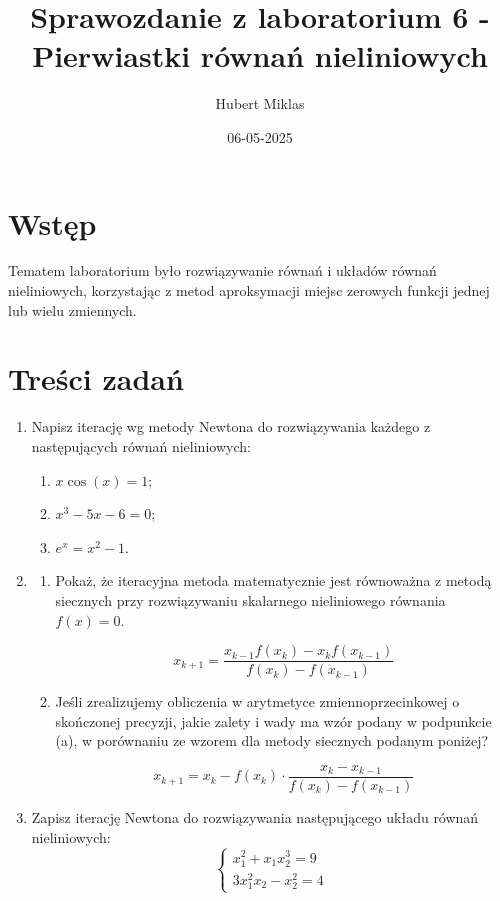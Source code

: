 \documentclass[a4paper,12pt]{article}
\title{Sprawozdanie z laboratorium 6 - Pierwiastki równań nieliniowych}
\author{Hubert Miklas}
\date{06-05-2025}
\begin{document}
    
    \maketitle
    
    \section{Wstęp}
    
    Tematem laboratorium było rozwiązywanie równań i układów równań nieliniowych, korzystając z metod aproksymacji miejsc zerowych funkcji jednej lub wielu zmiennych.
    
    \section{Treści zadań}
    
    \begin{enumerate}
      \item Napisz iterację wg metody Newtona do rozwiązywania każdego z następujących równań nieliniowych:
      \begin{enumerate}
        \item $x \cos(x) = 1$;
        \item $x^3 - 5x - 6 = 0$;
        \item $e^x = x^2 - 1$.
      \end{enumerate}
    
      \item 
      \begin{enumerate}
        \item Pokaż, że iteracyjna metoda matematycznie jest równoważna z metodą siecznych przy rozwiązywaniu skalarnego nieliniowego równania $f(x) = 0$.
        
        \[
        x_{k+1} = \frac{x_{k-1} f(x_k) - x_k f(x_{k-1})}{f(x_k) - f(x_{k-1})}
        \]
    
        \item Jeśli zrealizujemy obliczenia w arytmetyce zmiennoprzecinkowej o skończonej precyzji, jakie zalety i wady ma wzór podany w podpunkcie (a), w porównaniu ze wzorem dla metody siecznych podanym poniżej?
    
        \[
        x_{k+1} = x_k - f(x_k) \cdot \frac{x_k - x_{k-1}}{f(x_k) - f(x_{k-1})}
        \]
      \end{enumerate}
    
      \item Zapisz iterację Newtona do rozwiązywania następującego układu równań nieliniowych:
      \[
      \begin{cases}
      x_1^2 + x_1 x_2^3 = 9 \\
      3 x_1^2 x_2 - x_2^2 = 4
      \end{cases}
      \]
    \end{enumerate}
    
\end{document}
